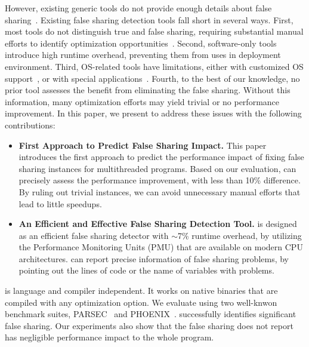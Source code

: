 However, existing generic tools do not provide enough details about false sharing~\cite{gprof, ibs-sc, Intel:VTune}. Existing false sharing detection tools fall short in several ways. First, most tools do not distinguish true and false sharing, requiring substantial manual efforts to identify optimization opportunities~\cite{falseshare:binaryinstrumentation1,detect:ptu,detect:intel,falseshare:binaryinstrumentation2,DProf, qinzhao, OSdetection, mldetect, Wicaksono11detectingfalse, openmp}. Second, software-only tools~\cite{falseshare:binaryinstrumentation1,falseshare:binaryinstrumentation2,falseshare:simulator, Predator} introduce high runtime overhead, preventing them from uses in deployment environment. Third, OS-related tools have limitations, either with customized OS support~\cite{OSdetection}, or with special applications~\cite{Sheriff}. Fourth, to the best of our knowledge, no prior tool assesses the benefit from eliminating the false sharing. Without this information, many optimization efforts may yield trivial or no performance improvement.
In this paper, we present \cheetah{} to address these issues with the following contributions:
\begin{itemize} 

\item {\bf First Approach to Predict False Sharing Impact.} This paper introduces the first approach to predict the performance impact of fixing false sharing instances for multithreaded programs. Based on our evaluation, \cheetah{} can precisely assess the performance improvement, with less than 10\% difference. By ruling out trivial instances, we can avoid unnecessary manual efforts that lead to little speedups. 

\item {\bf An Efficient and Effective False Sharing Detection Tool.} \cheetah{} is designed as an efficient false sharing detector with $\sim$7\% runtime overhead, by utilizing the Performance Monitoring Units (PMU) that are available on modern CPU architectures. \cheetah{} can report precise information of false sharing problems, by pointing out the lines of code or the name of variables with problems. 
\end{itemize}
\cheetah{} is language and compiler independent. It works on native binaries that are compiled with any optimization option. We evaluate \cheetah{} using two well-knwon benchmark suites, PARSEC~\cite{} and PHOENIX~\cite{}. \cheetah{} successfully identifies significant false sharing. Our experiments also show that the false sharing \cheetah{} does not report has negligible performance impact to the whole program.
%

